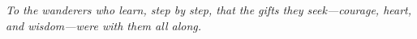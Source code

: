 
\cleardoublepage
\begingroup
  \hypersetup{pageanchor=false}%
  \thispagestyle{empty}
  \vspace*{\fill}
  \begin{center}\itshape
  To the wanderers who learn, step by step, that the gifts they seek—courage, heart, and wisdom—were with them all along.
  \end{center}
  \vspace*{\fill}
  \clearpage
\endgroup

\vspace{0.75\baselineskip}